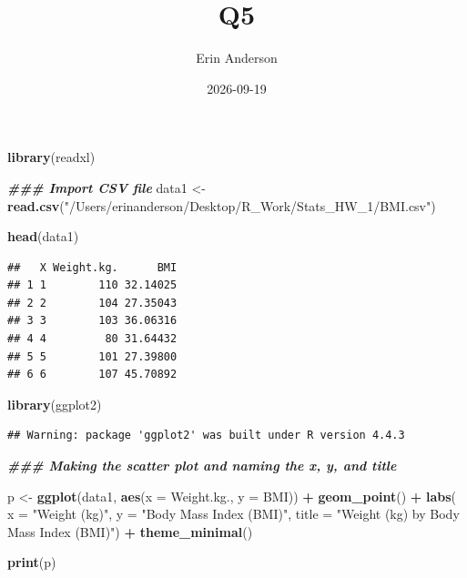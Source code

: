 \documentclass[
]{article}
\title{Q5}
\author{Erin Anderson}
\date{2026-09-19}
\newenvironment{Shaded}{\begin{snugshade}}{\end{snugshade}}
\newcommand{\AttributeTok}[1]{\textcolor[rgb]{0.13,0.29,0.53}{#1}}
\newcommand{\DocumentationTok}[1]{\textcolor[rgb]{0.56,0.35,0.01}{\textbf{\textit{#1}}}}
\newcommand{\FunctionTok}[1]{\textcolor[rgb]{0.13,0.29,0.53}{\textbf{#1}}}
\newcommand{\NormalTok}[1]{#1}
\newcommand{\OtherTok}[1]{\textcolor[rgb]{0.56,0.35,0.01}{#1}}
\newcommand{\SpecialCharTok}[1]{\textcolor[rgb]{0.81,0.36,0.00}{\textbf{#1}}}
\newcommand{\StringTok}[1]{\textcolor[rgb]{0.31,0.60,0.02}{#1}}
\begin{document}
\maketitle

\begin{Shaded}
\begin{Highlighting}[]
\FunctionTok{library}\NormalTok{(readxl)}

\DocumentationTok{\#\#\# Import CSV file}
\NormalTok{data1 }\OtherTok{\textless{}{-}} \FunctionTok{read.csv}\NormalTok{(}\StringTok{"/Users/erinanderson/Desktop/R\_Work/Stats\_HW\_1/BMI.csv"}\NormalTok{)}

\FunctionTok{head}\NormalTok{(data1)}
\end{Highlighting}
\end{Shaded}

\begin{verbatim}
##   X Weight.kg.      BMI
## 1 1        110 32.14025
## 2 2        104 27.35043
## 3 3        103 36.06316
## 4 4         80 31.64432
## 5 5        101 27.39800
## 6 6        107 45.70892
\end{verbatim}

\begin{Shaded}
\begin{Highlighting}[]
\FunctionTok{library}\NormalTok{(ggplot2)}
\end{Highlighting}
\end{Shaded}

\begin{verbatim}
## Warning: package 'ggplot2' was built under R version 4.4.3
\end{verbatim}

\begin{Shaded}
\begin{Highlighting}[]
\DocumentationTok{\#\#\# Making the scatter plot and naming the x, y, and title}

\NormalTok{p }\OtherTok{\textless{}{-}} \FunctionTok{ggplot}\NormalTok{(data1, }\FunctionTok{aes}\NormalTok{(}\AttributeTok{x =}\NormalTok{ Weight.kg., }\AttributeTok{y =}\NormalTok{ BMI)) }\SpecialCharTok{+} 
  \FunctionTok{geom\_point}\NormalTok{() }\SpecialCharTok{+}
  \FunctionTok{labs}\NormalTok{(}
    \AttributeTok{x =} \StringTok{"Weight (kg)"}\NormalTok{,}
    \AttributeTok{y =} \StringTok{"Body Mass Index (BMI)"}\NormalTok{, }
    \AttributeTok{title =} \StringTok{"Weight (kg) by Body Mass Index (BMI)"}\NormalTok{) }\SpecialCharTok{+}
  \FunctionTok{theme\_minimal}\NormalTok{()}

\FunctionTok{print}\NormalTok{(p)  }
\end{Highlighting}
\end{Shaded}
\end{document}

